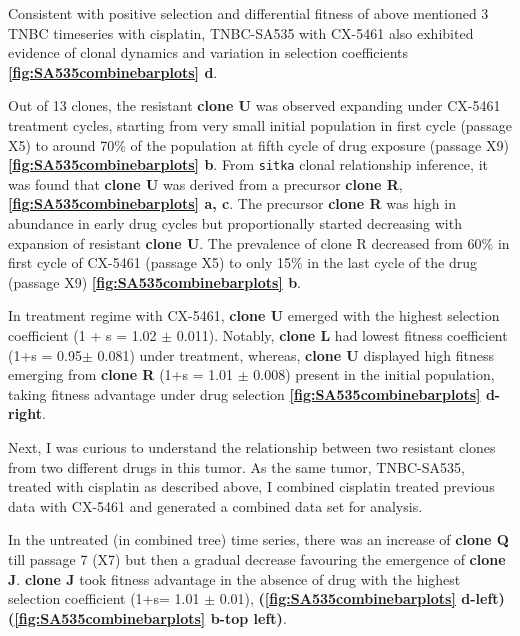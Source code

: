 Consistent with positive selection and differential fitness of above mentioned 3 TNBC timeseries with cisplatin, TNBC-SA535 with CX-5461 also exhibited evidence of clonal dynamics and variation in selection coefficients \textbf{\autoref{fig:SA535combinebarplots} d}. 


Out of 13 clones, the resistant \textbf{clone U} was observed expanding under CX-5461 treatment cycles, starting from very small initial population in first cycle (passage X5) to around 70\% of the population at fifth cycle of drug exposure (passage X9) \textbf{\autoref{fig:SA535combinebarplots} b}. From \texttt{sitka} clonal relationship inference, it was found that \textbf{clone U} was derived from a precursor \textbf{clone R},  \textbf{\autoref{fig:SA535combinebarplots} a, c}. The precursor \textbf{clone R} was high in abundance in early drug cycles but proportionally started decreasing with expansion of resistant \textbf{clone U}. The prevalence of clone R decreased from 60\% in first cycle of CX-5461 (passage X5) to only 15\% in the last cycle of the drug (passage X9) \textbf{\autoref{fig:SA535combinebarplots} b}. 


In treatment regime with CX-5461, \textbf{clone U} emerged with the highest selection coefficient (1 + s = 1.02 $\pm$ 0.011). Notably, \textbf{clone L} had lowest fitness coefficient (1+s = 0.95$\pm$ 0.081) under treatment, whereas, \textbf{clone U} displayed high fitness emerging from \textbf{clone R} (1+s = 1.01 $\pm$ 0.008) present in the initial population, taking fitness advantage under drug selection \textbf{\autoref{fig:SA535combinebarplots} d-right}. 

Next, I was curious to understand the relationship between two resistant clones from two different drugs in this tumor. As the same tumor, TNBC-SA535, treated with cisplatin as described above, I combined cisplatin treated previous data with CX-5461 and generated a combined data set for analysis. 


In the untreated (in combined tree) time series, there was an increase of \textbf{clone Q} till passage 7 (X7) but then a gradual decrease favouring the emergence of \textbf{clone J}. \textbf{clone J} took fitness advantage in the absence of drug with the highest selection coefficient (1+s= 1.01 $\pm$ 0.01),  \textbf{(\autoref{fig:SA535combinebarplots} d-left)}  \textbf{(\autoref{fig:SA535combinebarplots} b-top left)}. 

